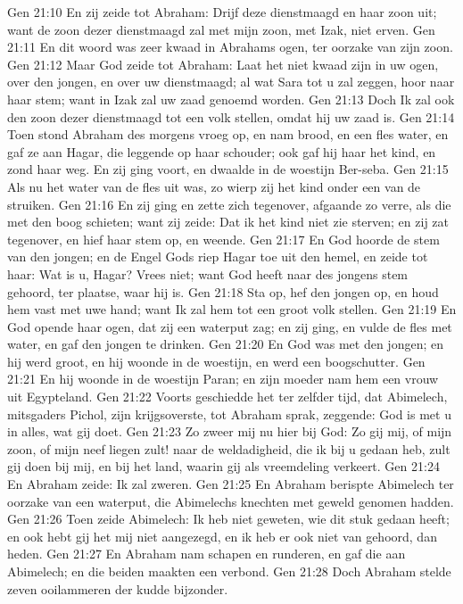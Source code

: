 Gen 21:10  En zij zeide tot Abraham: Drijf deze dienstmaagd en haar zoon uit; want de zoon dezer dienstmaagd zal met mijn zoon, met Izak, niet erven.
Gen 21:11  En dit woord was zeer kwaad in Abrahams ogen, ter oorzake van zijn zoon.
Gen 21:12  Maar God zeide tot Abraham: Laat het niet kwaad zijn in uw ogen, over den jongen, en over uw dienstmaagd; al wat Sara tot u zal zeggen, hoor naar haar stem; want in Izak zal uw zaad genoemd worden.
Gen 21:13  Doch Ik zal ook den zoon dezer dienstmaagd tot een volk stellen, omdat hij uw zaad is.
Gen 21:14  Toen stond Abraham des morgens vroeg op, en nam brood, en een fles water, en gaf ze aan Hagar, die leggende op haar schouder; ook gaf hij haar het kind, en zond haar weg. En zij ging voort, en dwaalde in de woestijn Ber-seba.
Gen 21:15  Als nu het water van de fles uit was, zo wierp zij het kind onder een van de struiken.
Gen 21:16  En zij ging en zette zich tegenover, afgaande zo verre, als die met den boog schieten; want zij zeide: Dat ik het kind niet zie sterven; en zij zat tegenover, en hief haar stem op, en weende.
Gen 21:17  En God hoorde de stem van den jongen; en de Engel Gods riep Hagar toe uit den hemel, en zeide tot haar: Wat is u, Hagar? Vrees niet; want God heeft naar des jongens stem gehoord, ter plaatse, waar hij is.
Gen 21:18  Sta op, hef den jongen op, en houd hem vast met uwe hand; want Ik zal hem tot een groot volk stellen.
Gen 21:19  En God opende haar ogen, dat zij een waterput zag; en zij ging, en vulde de fles met water, en gaf den jongen te drinken.
Gen 21:20  En God was met den jongen; en hij werd groot, en hij woonde in de woestijn, en werd een boogschutter.
Gen 21:21  En hij woonde in de woestijn Paran; en zijn moeder nam hem een vrouw uit Egypteland.
Gen 21:22  Voorts geschiedde het ter zelfder tijd, dat Abimelech, mitsgaders Pichol, zijn krijgsoverste, tot Abraham sprak, zeggende: God is met u in alles, wat gij doet.
Gen 21:23  Zo zweer mij nu hier bij God: Zo gij mij, of mijn zoon, of mijn neef liegen zult! naar de weldadigheid, die ik bij u gedaan heb, zult gij doen bij mij, en bij het land, waarin gij als vreemdeling verkeert.
Gen 21:24  En Abraham zeide: Ik zal zweren.
Gen 21:25  En Abraham berispte Abimelech ter oorzake van een waterput, die Abimelechs knechten met geweld genomen hadden.
Gen 21:26  Toen zeide Abimelech: Ik heb niet geweten, wie dit stuk gedaan heeft; en ook hebt gij het mij niet aangezegd, en ik heb er ook niet van gehoord, dan heden.
Gen 21:27  En Abraham nam schapen en runderen, en gaf die aan Abimelech; en die beiden maakten een verbond.
Gen 21:28  Doch Abraham stelde zeven ooilammeren der kudde bijzonder.

